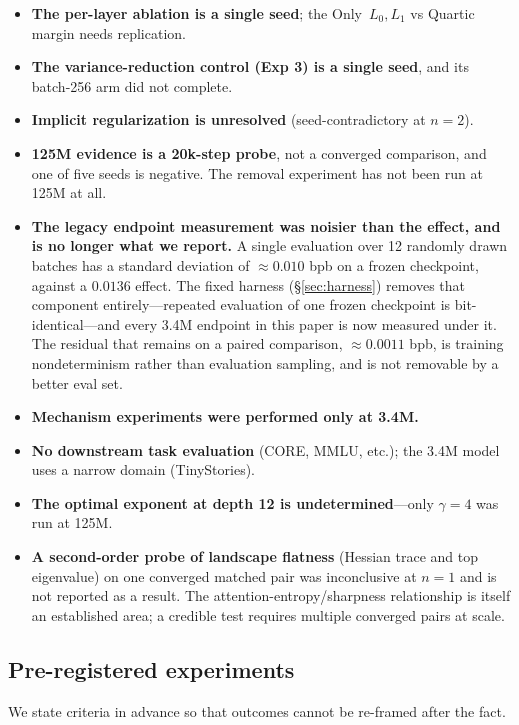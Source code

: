 \documentclass[11pt,a4paper]{article}
\begin{document}
\begin{itemize}
    \item \textbf{The per-layer ablation is a single seed}; the Only~$L_0,L_1$ vs Quartic margin needs replication.
    \item \textbf{The variance-reduction control (Exp 3) is a single seed}, and its batch-256 arm did not complete.
    \item \textbf{Implicit regularization is unresolved} (seed-contradictory at $n=2$).
    \item \textbf{125M evidence is a 20k-step probe}, not a converged comparison, and one of five seeds is negative. The removal experiment has not been run at 125M at all.
    \item \textbf{The legacy endpoint measurement was noisier than the effect, and is no longer what we report.} A single evaluation over 12 randomly drawn batches has a standard deviation of ${\approx}0.010$ bpb on a frozen checkpoint, against a $0.0136$ effect. The fixed harness (\S\ref{sec:harness}) removes that component entirely---repeated evaluation of one frozen checkpoint is bit-identical---and every 3.4M endpoint in this paper is now measured under it. The residual that remains on a paired comparison, ${\approx}0.0011$ bpb, is training nondeterminism rather than evaluation sampling, and is not removable by a better eval set.
    \item \textbf{Mechanism experiments were performed only at 3.4M.}
    \item \textbf{No downstream task evaluation} (CORE, MMLU, etc.); the 3.4M model uses a narrow domain (TinyStories).
    \item \textbf{The optimal exponent at depth 12 is undetermined}---only $\gamma = 4$ was run at 125M.
    \item \textbf{A second-order probe of landscape flatness} (Hessian trace and top eigenvalue) on one converged matched pair was inconclusive at $n=1$ and is not reported as a result. The attention-entropy/sharpness relationship is itself an established area; a credible test requires multiple converged pairs at scale.
\end{itemize}

\subsection{Pre-registered experiments}

We state criteria in advance so that outcomes cannot be re-framed after the fact.
\end{document}
